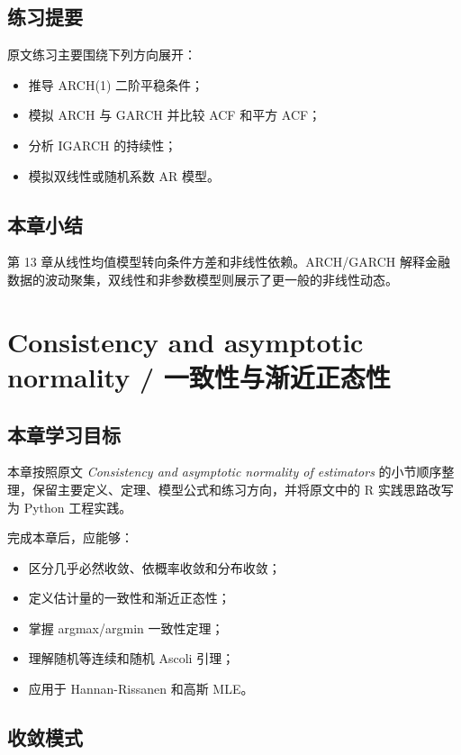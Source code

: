 \documentclass[11pt,a4paper,openany]{ctexbook}
\begin{document}
\section{练习提要}

原文练习主要围绕下列方向展开：
\begin{itemize}
  \item 推导 ARCH(1) 二阶平稳条件；
  \item 模拟 ARCH 与 GARCH 并比较 ACF 和平方 ACF；
  \item 分析 IGARCH 的持续性；
  \item 模拟双线性或随机系数 AR 模型。
\end{itemize}

\section*{本章小结}

第 13 章从线性均值模型转向条件方差和非线性依赖。ARCH/GARCH 解释金融数据的波动聚集，双线性和非参数模型则展示了更一般的非线性动态。

\clearpage
\chapter{Consistency and asymptotic normality / 一致性与渐近正态性}
\section*{本章学习目标}

本章按照原文 \textit{Consistency and asymptotic normality of estimators} 的小节顺序整理，保留主要定义、定理、模型公式和练习方向，并将原文中的 R 实践思路改写为 Python 工程实践。

完成本章后，应能够：
\begin{itemize}
  \item 区分几乎必然收敛、依概率收敛和分布收敛；
  \item 定义估计量的一致性和渐近正态性；
  \item 掌握 argmax/argmin 一致性定理；
  \item 理解随机等连续和随机 Ascoli 引理；
  \item 应用于 Hannan-Rissanen 和高斯 MLE。
\end{itemize}

\section{收敛模式}
\end{document}
